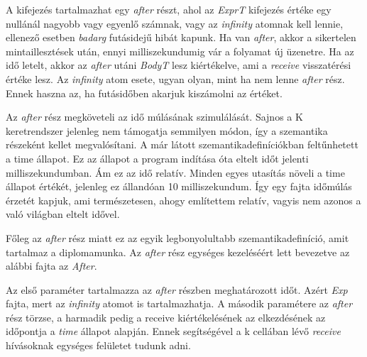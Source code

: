 

A kifejezés tartalmazhat egy \textit{after} részt, ahol az \textit{ExprT} kifejezés értéke egy nullánál nagyobb vagy egyenlő számnak, vagy az \textit{infinity} atomnak kell lennie, ellenező esetben \textit{badarg} futásidejű hibát kapunk. Ha van \textit{after}, akkor a sikertelen mintaillesztések után, ennyi milliszekundumig vár a folyamat új üzenetre. Ha az idő letelt, akkor az \textit{after} utáni \textit{BodyT} lesz kiértékelve, ami a \textit{receive} visszatérési értéke lesz. Az \textit{infinity} atom esete, ugyan olyan, mint ha nem lenne \textit{after} rész. Ennek haszna az, ha futásidőben akarjuk kiszámolni az értéket.

Az \textit{after} rész megköveteli az idő múlásának szimulálását. Sajnos a K keretrendszer jelenleg nem támogatja semmilyen módon, így a szemantika részeként kellet megvalósítani. A már látott szemantikadefiníciókban feltűnhetett a time állapot. Ez az állapot a program indítása óta eltelt időt jelenti milliszekundumban. Ám ez az idő relatív. Minden egyes utasítás növeli a time állapot értékét, jelenleg ez állandóan 10 milliszekundum. Így egy fajta időmúlás érzetét kapjuk, ami természetesen, ahogy említettem relatív, vagyis nem azonos a való világban eltelt idővel.

Főleg az \textit{after} rész miatt ez az egyik legbonyolultabb szemantikadefiníció, amit tartalmaz a diplomamunka. Az \textit{after} rész egységes kezeléséért lett bevezetve az alábbi fajta az \textit{After}.



Az első paraméter tartalmazza az \textit{after} részben meghatározott időt. Azért \textit{Exp} fajta, mert az \textit{infinity} atomot is tartalmazhatja. A második paramétere az \textit{after} rész törzse, a harmadik pedig a receive kiértékelésének az elkezdésének az időpontja a \textit{time} állapot alapján. Ennek segítségével a k cellában lévő \textit{receive} hívásoknak egységes felületet tudunk adni.



